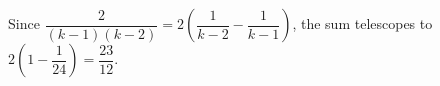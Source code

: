 Since $\dfrac{2}{(k-1)(k-2)}=2\left(\dfrac{1}{k-2}-\dfrac{1}{k-1}\right)$, the sum telescopes to $2(1-\dfrac{1}{24})=\boxed{\dfrac{23}{12}}$.
